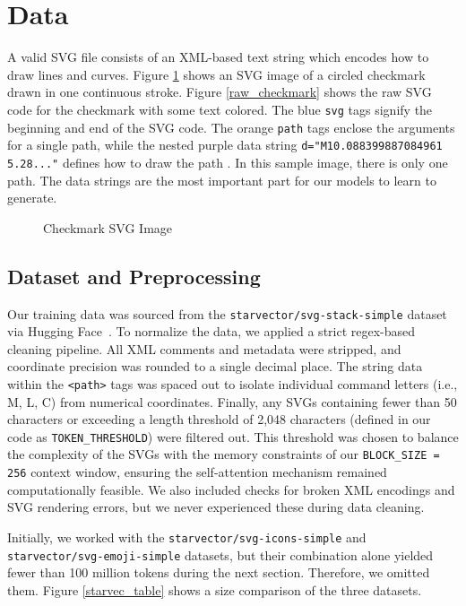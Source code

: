 \documentclass[11pt]{article}
\begin{document}
\section{Data}

A valid SVG file consists of an XML-based text string which encodes how to draw lines and curves.
Figure \ref{checkmark_1} shows an SVG image of a circled checkmark drawn in one continuous stroke.
Figure \ref{raw_checkmark} shows the raw SVG code for the checkmark with some text colored.
The blue \verb|svg| tags signify the beginning and end of the SVG code.
The orange \verb|path| tags enclose the arguments for a single path, while the nested
purple data string \verb|d="M10.088399887084961 5.28..."| defines how to draw the path \cite{mdn}.
In this sample image, there is only one path.
The data strings are the most important part for our models to learn to generate.

\begin{figure}[htbp]
	\centering
	\caption{Checkmark SVG Image}\label{checkmark_1}
\end{figure}


\subsection{Dataset and Preprocessing}


Our training data was sourced from the \verb|starvector/svg-stack-simple| dataset via Hugging Face~\cite{rodriguez2023starvector}.
To normalize the data, we applied a strict regex-based cleaning pipeline.
All XML comments and metadata were stripped, and coordinate precision was rounded to a single decimal place.
The string data within the \verb|<path>| tags was spaced out to isolate individual command letters (i.e., M, L, C)
from numerical coordinates. Finally, any SVGs containing fewer than 50 characters or exceeding a length threshold
of 2,048 characters (defined in our code as \verb|TOKEN_THRESHOLD|) were filtered out.
This threshold was chosen to balance the complexity of the SVGs with the
memory constraints of our \verb|BLOCK_SIZE = 256| context window, ensuring the self-attention mechanism remained computationally feasible.
We also included checks for broken XML encodings and SVG rendering errors, but we never experienced these during data cleaning.

Initially, we worked with the \verb|starvector/svg-icons-simple| and \verb|starvector/svg-emoji-simple|
datasets, but their combination alone yielded fewer than 100 million tokens during the next section. Therefore, we omitted them.
Figure \ref{starvec_table} shows a size comparison of the three datasets.
\end{document}
